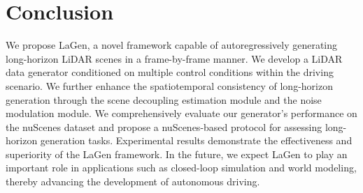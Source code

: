 \section{Conclusion}
\label{sec:conclusion}

We propose LaGen, a novel framework capable of autoregressively generating long-horizon LiDAR scenes in a frame-by-frame manner.
We develop a LiDAR data generator conditioned on multiple control conditions within the driving scenario.
We further enhance the spatiotemporal consistency of long-horizon generation through the scene decoupling estimation module and the noise modulation module.
We comprehensively evaluate our generator’s performance on the nuScenes dataset and propose a nuScenes-based protocol for assessing long-horizon generation tasks. 
Experimental results demonstrate the effectiveness and superiority of the LaGen framework.
In the future, we expect LaGen to play an important role in applications such as closed-loop simulation and world modeling, thereby advancing the development of autonomous driving.